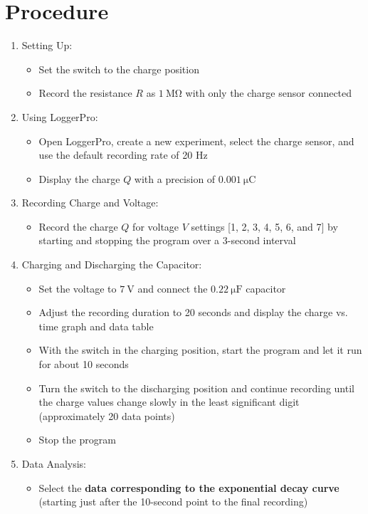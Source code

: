 \documentclass[11pt]{article}
\begin{document}
\section{Procedure}
\begin{enumerate}
    \item Setting Up:
    \begin{itemize}
        \item Set the switch to the charge position
        \item Record the resistance $R$ as $\SI{1}{\mega\ohm}$ with only the charge sensor connected
    \end{itemize}
    \item Using LoggerPro:
    \begin{itemize}
        \item Open LoggerPro, create a new experiment, select the charge sensor, and use the default recording rate of 20 Hz
        \item Display the charge $Q$ with a precision of $\SI{0.001}{\micro\coulomb}$
    \end{itemize}
    \item Recording Charge and Voltage:
    \begin{itemize}
        \item Record the charge $Q$ for voltage $V$ settings [1, 2, 3, 4, 5, 6, and 7] by starting and stopping the program over a 3-second interval
    \end{itemize}
    \item Charging and Discharging the Capacitor:
    \begin{itemize}
        \item Set the voltage to $\SI{7}{\volt}$ and connect the $\SI{0.22}{\micro\farad}$ capacitor
        \item Adjust the recording duration to 20 seconds and display the charge vs. time graph and data table
        \item With the switch in the charging position, start the program and let it run for about 10 seconds
        \item Turn the switch to the discharging position and continue recording until the charge values change slowly in the least significant digit (approximately 20 data points)
        \item Stop the program
    \end{itemize}
    \item Data Analysis:
    \begin{itemize}
        \item Select the \textbf{data corresponding to the exponential decay curve} (starting just after the 10-second point to the final recording)

\end{itemize}
\end{enumerate}
\end{document}
